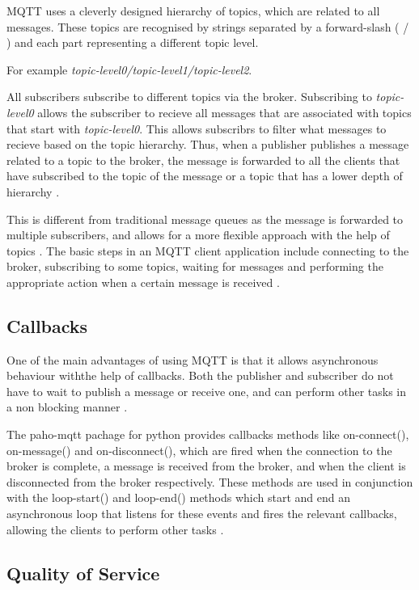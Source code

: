 \documentclass[sigconf]{acmart}
\begin{document}
MQTT uses a cleverly designed hierarchy of topics, which are related
to all messages. These topics are recognised by strings separated by a
forward-slash ( / ) and each part representing a different topic
level.

For example {\em topic-level0/topic-level1/topic-level2}.

All subscribers subscribe to different topics via the broker.
Subscribing to {\em topic-level0} allows the subscriber to recieve all
messages that are associated with topics that start with {\em
  topic-level0}. This allows subscribrs to filter what messages to
recieve based on the topic hierarchy. Thus, when a publisher publishes
a message related to a topic to the broker, the message is forwarded
to all the clients that have subscribed to the topic of the message or
a topic that has a lower depth of hierarchy \cite{hivemq-details}
\cite{how-mqtt-works}.

This is different from traditional message queues as the message is
forwarded to multiple subscribers, and allows for a more flexible
approach with the help of topics \cite{hivemq-details}. The basic
steps in an MQTT client application include connecting to the broker,
subscribing to some topics, waiting for messages and performing the
appropriate action when a certain message is received
\cite{mqtt-wiki}.
 
\subsection{Callbacks}

One of the main advantages of using MQTT is that it allows
asynchronous behaviour withthe help of callbacks. Both the publisher
and subscriber do not have to wait to publish a message or receive
one, and can perform other tasks in a non blocking manner
\cite{hivemq-details} \cite{python-paho-mqtt}.

The paho-mqtt pachage for python provides callbacks methods like
on-connect(), on-message() and on-disconnect(), which are fired when
the connection to the broker is complete, a message is received from
the broker, and when the client is disconnected from the broker
respectively. These methods are used in conjunction with the
loop-start() and loop-end() methods which start and end an
asynchronous loop that listens for these events and fires the relevant
callbacks, allowing the clients to perform other tasks
\cite{python-paho-mqtt}.

\subsection{Quality of Service}
\end{document}
